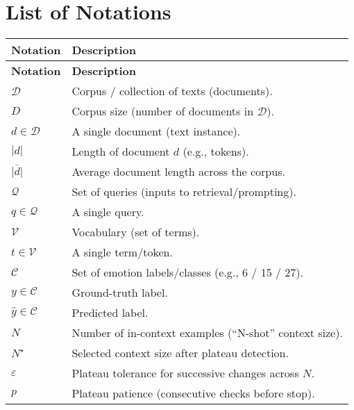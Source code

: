 
\chapter*{List of Notations}
\thispagestyle{plain}

\begin{longtable}{p{} p{}}
\toprule
\textbf{Notation} & \textbf{Description} \\
\midrule
\endfirsthead
\toprule
\textbf{Notation} & \textbf{Description} \\
\midrule
\endhead
\bottomrule
\endlastfoot

$\mathcal{D}$          & Corpus / collection of texts (documents). \\
$D$                    & Corpus size (number of documents in $\mathcal{D}$). \\
$d \in \mathcal{D}$    & A single document (text instance). \\
$|d|$                  & Length of document $d$ (e.g., tokens). \\
$\overline{|d|}$       & Average document length across the corpus. \\
$\mathcal{Q}$          & Set of queries (inputs to retrieval/prompting). \\
$q \in \mathcal{Q}$    & A single query. \\
$\mathcal{V}$          & Vocabulary (set of terms). \\
$t \in \mathcal{V}$    & A single term/token. \\

$\mathcal{C}$          & Set of emotion labels/classes (e.g., 6 / 15 / 27). \\
$y \in \mathcal{C}$    & Ground-truth label. \\
$\hat{y} \in \mathcal{C}$ & Predicted label. \\

$N$                    & Number of in-context examples (“N-shot” context size). \\
$N^\star$              & Selected context size after plateau detection. \\
$\varepsilon$          & Plateau tolerance for successive changes across $N$. \\
$p$                    & Plateau patience (consecutive checks before stop). \\


\end{longtable}

